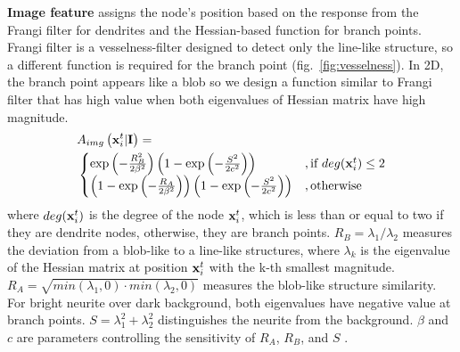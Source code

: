 \documentclass{article}
\begin{document}
{\bf Image feature} assigns the node's position based on the response from the Frangi filter \cite{Frangi1998} for dendrites and the Hessian-based function for branch points. Frangi filter is a vesselness-filter designed to detect only the line-like structure, so a different function is required for the branch point (fig.~\ref{fig:vesselness}). In 2D, the branch point appears like a blob so we design a function similar to Frangi filter that has high value when both eigenvalues of Hessian matrix have high magnitude.
\begin{equation} \label{eq:vesselness}
\begin{aligned}
&A_{img}\left({\bf x}_i^t | {\bf I}\right) = \\
&\begin{cases}
\exp \left( -\frac{R_B^2}{2\beta^2} \right) \left(1-\exp \left( -\frac{S^2}{2c^2} \right) \right) &, \mbox{if } deg({\bf x}_i^t) \le 2 \\
\left( 1-\exp \left( -\frac{R_A}{2\beta^2} \right) \right) \left(1-\exp \left( -\frac{S^2}{2c^2} \right) \right) &, \mbox{otherwise}\\
\end{cases}
\end{aligned}
\end{equation}
where $deg({\bf x}_i^t)$ is the degree of the node ${\bf x}_i^t$, which is less than or equal to two if they are dendrite nodes, otherwise, they are branch points. $R_B = \lambda_1/\lambda_2$ measures the deviation from a blob-like to a line-like structures, where $\lambda_k$ is the eigenvalue of the Hessian matrix at position ${\bf x}_i^t$ with the k-th smallest magnitude. $R_A = \sqrt{min(\lambda_1,0) \cdot min(\lambda_2,0)}$ measures the blob-like structure similarity. For bright neurite over dark background, both eigenvalues have negative value at branch points. $S = \lambda_1^2 + \lambda_2^2$ distinguishes the neurite from the background. $\beta$ and $c$ are parameters controlling the sensitivity of $R_A$, $R_B$, and $S$ \cite{Frangi1998}.
\end{document}
